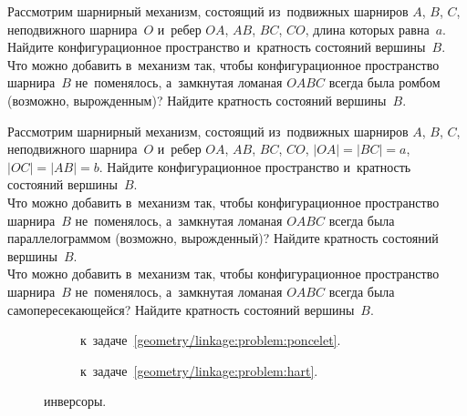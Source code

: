 \begin{problems}

\item
\subproblem
Рассмотрим шарнирный механизм, состоящий из~подвижных шарниров $A$, $B$, $C$,
неподвижного шарнира~$O$ и~ребер $OA$, $AB$, $BC$, $CO$, длина которых
равна~$a$.
Найдите конфигурационное пространство и~кратность состояний вершины~$B$.
\\
\subproblem{}
\label{geometry/linkage:problem:rombus}%
Что можно добавить в~механизм так, чтобы конфигурационное пространство
шарнира~$B$ не~поменялось, а~замкнутая ломаная $OABC$ всегда была ромбом
(возможно, вырожденным)?
Найдите кратность состояний вершины~$B$.

\item
\subproblem
Рассмотрим шарнирный механизм, состоящий из~подвижных шарниров $A$, $B$, $C$,
неподвижного шарнира~$O$ и~ребер $OA$, $AB$, $BC$, $CO$,
$|OA| = |BC| = a$, $|OC| = |AB| = b$.
Найдите конфигурационное пространство и~кратность состояний вершины~$B$.
\\
\subproblem{}
Что можно добавить в~механизм так, чтобы конфигурационное пространство
шарнира~$B$ не~поменялось, а~замкнутая ломаная $OABC$ всегда была
параллелограммом (возможно, вырожденный)?
Найдите кратность состояний вершины~$B$.
\\
\subproblem{}
\label{geometry/linkage:problem:antiparallelogram}%
Что можно добавить в~механизм так, чтобы конфигурационное пространство
шарнира~$B$ не~поменялось, а~замкнутая ломаная $OABC$ всегда была
самопересекающейся?
Найдите кратность состояний вершины~$B$.

\begin{figure}[ht]
\strut\hfill
\begin{subfigure}[b]{0.45\linewidth}
\begin{center}
    \caption{к~задаче~\ref{geometry/linkage:problem:poncelet}.}
    \label{geometry/linkage:problem:poncelet:fig}
\end{center}
\end{subfigure}%
\hfill
\begin{subfigure}[b]{0.35\linewidth}
\begin{center}
    \caption{к~задаче~\ref{geometry/linkage:problem:hart}.}
    \label{geometry/linkage:problem:hart:fig}
\end{center}
\end{subfigure}
\hfill\strut
\caption{инверсоры.}
\end{figure}


\end{problems}
